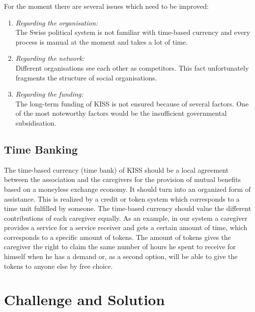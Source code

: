 \documentclass[12pt]{report}
\begin{document}
\newpage

For the moment there are several issues which need to be improved:
\begin{enumerate}
    \item \emph{Regarding the organisation:} \\
    The Swiss political system is not familiar with time-based currency and every process is manual at the moment and takes a lot of time.
    \item \emph{Regarding the network:} \\
    Different organisations see each other as competitors. This fact unfortunately fragments the structure of social organisations.
    \item \emph{Regarding the funding:} \\
    The long-term funding of KISS is not ensured because of several factors. One of the most noteworthy factors would be the insufficient governmental subsidisation.
\end{enumerate}

\section{Time Banking}
The time-based currency (time bank) of KISS should be a local agreement between the association and the caregivers for the provision of mutual benefits based on a moneyless exchange economy. It should turn into an organized form of assistance. This is realized by a credit or token system which corresponds to a time unit fulfilled by someone. The time-based currency should value the different contributions of each caregiver equally. As an example, in our system a caregiver provides a service for a service receiver and gets a certain amount of time, which corresponds to a specific amount of tokens. The amount of tokens gives the caregiver the right to claim the same number of hours he spent to receive for himself when he has a demand or, as a second option, will be able to give the tokens to anyone else by free choice.


\chapter{Challenge and Solution}

\end{document}
